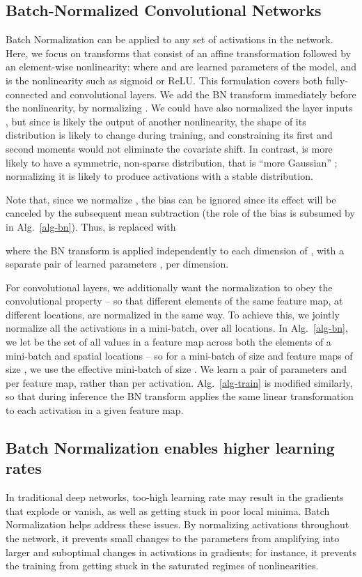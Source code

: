\documentclass[twocolumn]{article}
\begin{document}
\subsection{Batch-Normalized Convolutional Networks}
\label{sec-conv}

Batch Normalization can be applied to any set of activations in the network. Here, we focus on transforms that
consist of an affine transformation  followed by an element-wise
nonlinearity:  where  and  are learned parameters of the
model, and  is the nonlinearity such as sigmoid or
ReLU. This formulation covers both fully-connected and convolutional layers. We add the BN transform immediately before the nonlinearity, by normalizing .  We could have also normalized the layer inputs , but 
since  is likely the output of another nonlinearity, the
shape of its distribution is likely to change during training, and constraining its first and second moments would not eliminate the covariate shift.
In contrast,   is more likely to have a symmetric, non-sparse distribution,
that is ``more Gaussian'' \cite{ica}; normalizing it is likely to produce activations with a stable  distribution.

Note that, since we normalize , the bias  can be ignored since its
effect will be canceled by the subsequent mean subtraction (the role of the bias is subsumed by  in Alg.~\ref{alg-bn}). Thus,    is replaced with

where the BN transform is applied independently to each dimension of , with a separate pair of learned parameters ,  per dimension.

For convolutional layers, we  additionally want the normalization
to  obey the convolutional property -- so that different elements
of the same feature map, at different locations, are normalized in the
same way. To achieve this, we jointly normalize all the activations in
a mini-batch, over all locations. In Alg.~\ref{alg-bn}, we let
 be the set of all values in a feature map across both the
elements of a mini-batch and spatial locations -- so for a mini-batch
of size  and feature maps of size , we use the effective mini-batch of size . We learn a pair of parameters  and  per feature map, rather than per activation.
Alg.~\ref{alg-train} is modified similarly, so that during inference the BN transform applies the same linear transformation to each activation in a given feature map. 
	
\subsection{ Batch Normalization enables higher learning rates} 
\label{sec-lr}
 In
traditional deep networks, too-high learning rate may result in the gradients that explode or vanish, as well as getting stuck in poor local minima. Batch Normalization helps address these issues. By normalizing activations throughout the network, it prevents small changes to the parameters from amplifying into larger and suboptimal changes in activations in gradients; for instance, it prevents the training from getting stuck in the saturated regimes of nonlinearities.   
\end{document}
